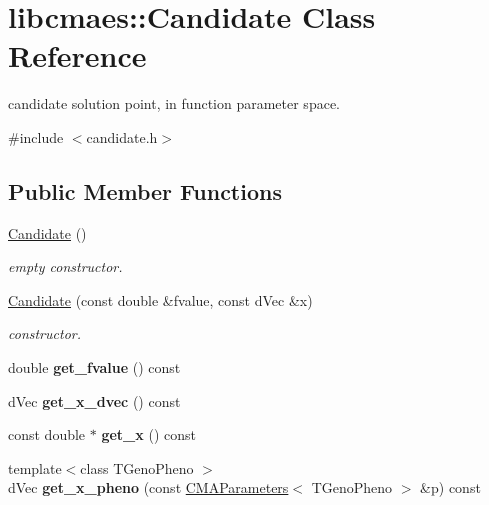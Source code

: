 \hypertarget{classlibcmaes_1_1Candidate}{\section{libcmaes\-:\-:Candidate Class Reference}
\label{classlibcmaes_1_1Candidate}
}


candidate solution point, in function parameter space.  




{\ttfamily \#include $<$candidate.\-h$>$}

\subsection*{Public Member Functions}
\begin{DoxyCompactItemize}
\item 
\hypertarget{classlibcmaes_1_1Candidate_a40fca2abb2e1bcec470a79fa5ae6525f}{\hyperlink{classlibcmaes_1_1Candidate_a40fca2abb2e1bcec470a79fa5ae6525f}{Candidate} ()}\label{classlibcmaes_1_1Candidate_a40fca2abb2e1bcec470a79fa5ae6525f}

\begin{DoxyCompactList}\small\item\em empty constructor. \end{DoxyCompactList}\item 
\hyperlink{classlibcmaes_1_1Candidate_aa15c585a460bcc7e0537b8f8defea205}{Candidate} (const double \&fvalue, const d\-Vec \&x)
\begin{DoxyCompactList}\small\item\em constructor. \end{DoxyCompactList}\item 
\hypertarget{classlibcmaes_1_1Candidate_aeca2ab3de5182036093745ec7f82834d}{double {\bfseries get\-\_\-fvalue} () const }\label{classlibcmaes_1_1Candidate_aeca2ab3de5182036093745ec7f82834d}

\item 
\hypertarget{classlibcmaes_1_1Candidate_a6155af392159bfc4d10722a7a0abf420}{d\-Vec {\bfseries get\-\_\-x\-\_\-dvec} () const }\label{classlibcmaes_1_1Candidate_a6155af392159bfc4d10722a7a0abf420}

\item 
\hypertarget{classlibcmaes_1_1Candidate_a22455c702f36ca4ea8c389477f8a7d1e}{const double $\ast$ {\bfseries get\-\_\-x} () const }\label{classlibcmaes_1_1Candidate_a22455c702f36ca4ea8c389477f8a7d1e}

\item 
\hypertarget{classlibcmaes_1_1Candidate_a08ca200644dcfe1faab23dd933f10598}{{\footnotesize template$<$class T\-Geno\-Pheno $>$ }\\d\-Vec {\bfseries get\-\_\-x\-\_\-pheno} (const \hyperlink{classlibcmaes_1_1CMAParameters}{C\-M\-A\-Parameters}$<$ T\-Geno\-Pheno $>$ \&p) const }\label{classlibcmaes_1_1Candidate_a08ca200644dcfe1faab23dd933f10598}

\end{DoxyCompactItemize}
